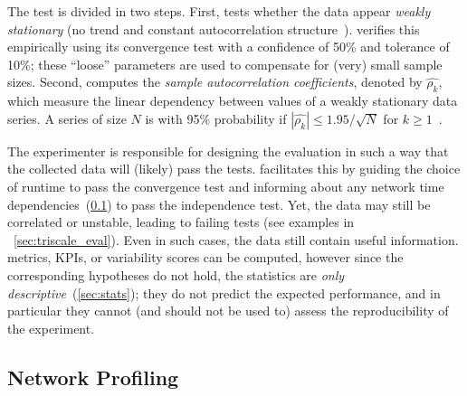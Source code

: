 The test is divided in two steps. First, \triscale tests whether the data appear \emph{weakly stationary} (\ie no trend and constant autocorrelation structure~\cite{brockwell1991Time}). \triscale verifies this empirically using its convergence test with a confidence of 50\% and tolerance of 10\%; these ``loose'' parameters are used to compensate for (very) small sample sizes.
Second, \triscale computes the \emph{sample autocorrelation coefficients}, denoted by $\widehat{\rho_k}$, which measure the linear dependency between values of a weakly stationary data series.
A series of size $N$ is \iid with 95\% probability if $|\widehat{\rho_k}| \leq 1.95/\sqrt{N}$ for $k \geq 1$~\cite{brockwell1991Time}.

The experimenter is responsible for designing the evaluation in such a way that the collected data will (likely) pass the tests.
\triscale facilitates this by guiding the choice of runtime to pass the convergence test and informing about any network time dependencies~(\cref{subsec:network_profiling}) to pass the independence test.
Yet, the data may still be correlated or unstable, leading to failing tests (see examples in ~\cref{sec:triscale_eval}).
Even in such cases, the data still contain useful information.
\triscale metrics, KPIs, or variability scores can be computed, however since the corresponding hypotheses do not hold, the statistics are \emph{only descriptive}~(\cref{sec:stats}); they do not predict the expected performance, and in particular they cannot (and should not be used to) assess the reproducibility of the experiment.

\subsection{Network Profiling}
\label{subsec:network_profiling}

